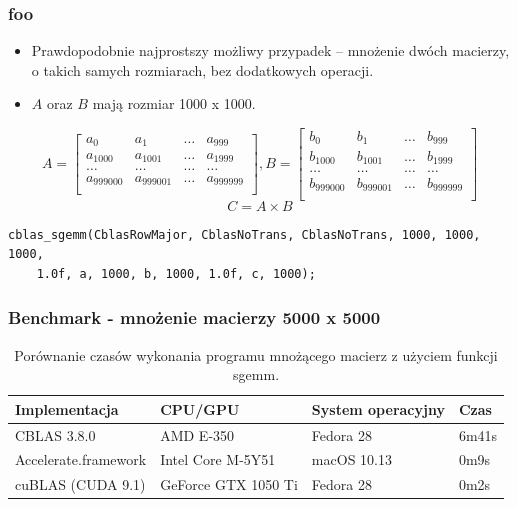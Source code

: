 \documentclass[dvipsnames,table]{beamer}
\begin{document}
\begin{frame}[fragile]
	\frametitle{foo}
\begin{itemize}
	\item Prawdopodobnie najprostszy możliwy przypadek -- mnożenie dwóch macierzy, o takich samych rozmiarach, bez dodatkowych operacji. 
	\item $A$ oraz $B$ mają rozmiar 1000 x 1000.
\end{itemize}
\scriptsize
\[
A =
\begin{bmatrix}
	a_{0} & a_{1} & \dots & a_{999} \\
	a_{1000} & a_{1001} & \dots & a_{1999} \\
	\dots & \dots & \dots & \dots \\
	a_{999000} & a_{999001} & \dots & a_{999999} \\
\end{bmatrix}
, B = 
\begin{bmatrix}
	b_{0} & b_{1} & \dots & b_{999} \\
	b_{1000} & b_{1001} & \dots & b_{1999} \\
	\dots & \dots & \dots & \dots \\
	b_{999000} & b_{999001} & \dots & b_{999999} \\
\end{bmatrix}
\]
\[
C = A \times B
\]
\normalsize
\begin{lstlisting}
cblas_sgemm(CblasRowMajor, CblasNoTrans, CblasNoTrans, 1000, 1000, 1000,
	1.0f, a, 1000, b, 1000, 1.0f, c, 1000);
\end{lstlisting}
\end{frame}

\begin{frame}
\frametitle{Benchmark - mnożenie macierzy 5000 x 5000}
\begin{table}[]
\centering
\caption{Porównanie czasów wykonania programu mnożącego macierz z użyciem funkcji sgemm.}
\label{porownanie}
\scriptsize
\begin{tabular}{llll}
\hline
Implementacja & CPU/GPU   & System operacyjny & Czas  \\ \hline
CBLAS 3.8.0   & AMD E-350 & Fedora 28         & 6m41s \\
Accelerate.framework & Intel Core M-5Y51  & macOS 10.13 & 0m9s  \\
cuBLAS (CUDA 9.1) & GeForce GTX 1050 Ti & Fedora 28 & 0m2s  \\ \hline
\end{tabular}
\normalsize
\end{table}
\end{frame}
\end{document}
